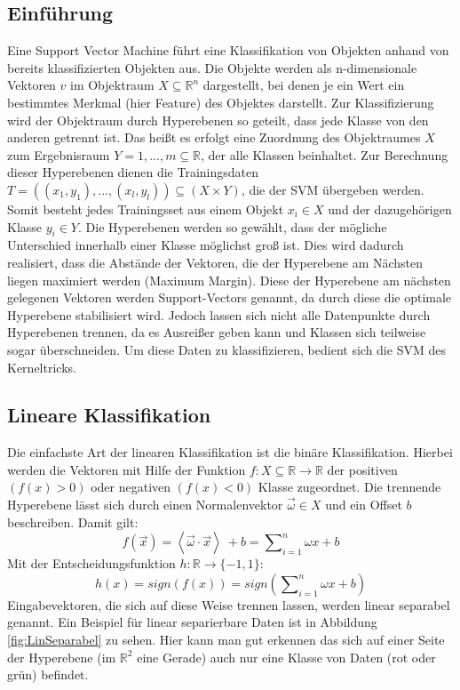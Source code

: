 \subsection{Einführung}
\label{subsec:einfuehrung}
Eine Support Vector Machine führt eine Klassifikation von Objekten anhand von bereits klassifizierten Objekten aus. Die Objekte werden als n-dimensionale Vektoren $v$ im Objektraum $X \subseteq \mathbb{R}^{n} $ dargestellt, bei denen je ein Wert ein bestimmtes Merkmal (hier Feature) des Objektes darstellt. Zur Klassifizierung wird der Objektraum durch Hyperebenen so geteilt, dass jede Klasse von den anderen getrennt ist. Das heißt es erfolgt eine Zuordnung des Objektraumes $X$ zum Ergebnisraum $Y = {1,...,m} \subseteq \mathbb{R}$, der alle Klassen beinhaltet. Zur Berechnung dieser Hyperebenen dienen die Trainingsdaten $T =((x_{1},y_{1}),...,(x_{l},y_{l})) \subseteq (X \times Y)$, die der SVM übergeben werden. Somit besteht jedes Trainingsset aus einem Objekt $x_{i} \in X$ und der dazugehörigen Klasse $y_{i} \in Y$. Die Hyperebenen werden so gewählt, dass der mögliche Unterschied innerhalb einer Klasse möglichst groß ist. Dies wird dadurch realisiert, dass die Abstände der Vektoren, die der Hyperebene am Nächsten liegen maximiert werden (Maximum Margin). Diese der Hyperebene am nächsten gelegenen Vektoren werden \glqq{}Support-Vectors\grqq{} genannt, da durch diese die optimale Hyperebene \glqq{}stabilisiert\grqq{} wird. Jedoch lassen sich nicht alle Datenpunkte durch Hyperebenen trennen, da es Ausreißer geben kann und Klassen sich teilweise sogar überschneiden. Um diese Daten zu klassifizieren, bedient sich die SVM des Kerneltricks. \cite{laechele-svm}

\subsection{Lineare Klassifikation}
\label{subsec:lineare-klassifikation}
Die einfachste Art der linearen Klassifikation ist die binäre Klassifikation. Hierbei werden die Vektoren mit Hilfe der Funktion $ f: X \subseteq \mathbb{R} \rightarrow \mathbb{R} $ der positiven $ (f(x)>0) $ oder negativen $ (f(x)<0) $ Klasse zugeordnet. Die trennende Hyperebene lässt sich durch einen Normalenvektor $\vec{\omega} \in X$ und ein Offset $b$ beschreiben.
Damit gilt:\[ f(\vec{x})=\left\langle \vec{\omega} \cdot \vec{x} \right\rangle\ + b = \sum\nolimits_{i=1}^n \omega x + b \]
Mit der Entscheidungsfunktion $h : \mathbb{R} \rightarrow \{-1,1\}$:
\[ h(x) = sign(f(x)) = sign (\sum\nolimits_{i=1}^n \omega x + b)\]
Eingabevektoren, die sich auf diese Weise trennen lassen, werden linear separabel genannt. Ein Beispiel für linear separierbare Daten ist in Abbildung \ref{fig:LinSeparabel} zu sehen. Hier kann man gut erkennen das sich auf einer Seite der Hyperebene (im $\mathbb{R}^2$ eine Gerade) auch nur eine Klasse von Daten (rot oder grün) befindet.

